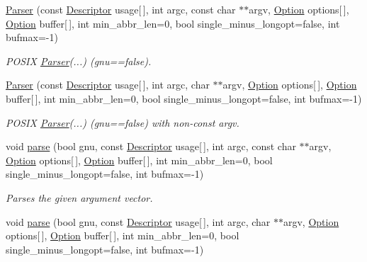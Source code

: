\begin{DoxyCompactItemize}
\hyperlink{classoption_1_1_parser_ae4100da4b662937ead22484e6cfc7cec}{Parser} (const \hyperlink{structoption_1_1_descriptor}{Descriptor} usage\mbox{[}$\,$\mbox{]}, int argc, const char $\ast$$\ast$argv, \hyperlink{classoption_1_1_option}{Option} options\mbox{[}$\,$\mbox{]}, \hyperlink{classoption_1_1_option}{Option} buffer\mbox{[}$\,$\mbox{]}, int min\+\_\+abbr\+\_\+len=0, bool single\+\_\+minus\+\_\+longopt=false, int bufmax=-\/1)
\begin{DoxyCompactList}\small\item\em P\+O\+S\+IX \hyperlink{classoption_1_1_parser}{Parser}(...) (gnu==false). \end{DoxyCompactList}\item 
\mbox{\label{classoption_1_1_parser_a23ee244634a38d05f6c4cb1e3692a8a9}} 
\hyperlink{classoption_1_1_parser_a23ee244634a38d05f6c4cb1e3692a8a9}{Parser} (const \hyperlink{structoption_1_1_descriptor}{Descriptor} usage\mbox{[}$\,$\mbox{]}, int argc, char $\ast$$\ast$argv, \hyperlink{classoption_1_1_option}{Option} options\mbox{[}$\,$\mbox{]}, \hyperlink{classoption_1_1_option}{Option} buffer\mbox{[}$\,$\mbox{]}, int min\+\_\+abbr\+\_\+len=0, bool single\+\_\+minus\+\_\+longopt=false, int bufmax=-\/1)
\begin{DoxyCompactList}\small\item\em P\+O\+S\+IX \hyperlink{classoption_1_1_parser}{Parser}(...) (gnu==false) with non-\/const argv. \end{DoxyCompactList}\item 
void \hyperlink{classoption_1_1_parser_a6e0b5778d1cfbd6cd51240e74d01e138}{parse} (bool gnu, const \hyperlink{structoption_1_1_descriptor}{Descriptor} usage\mbox{[}$\,$\mbox{]}, int argc, const char $\ast$$\ast$argv, \hyperlink{classoption_1_1_option}{Option} options\mbox{[}$\,$\mbox{]}, \hyperlink{classoption_1_1_option}{Option} buffer\mbox{[}$\,$\mbox{]}, int min\+\_\+abbr\+\_\+len=0, bool single\+\_\+minus\+\_\+longopt=false, int bufmax=-\/1)
\begin{DoxyCompactList}\small\item\em Parses the given argument vector. \end{DoxyCompactList}\item 
\mbox{\label{classoption_1_1_parser_ab26280e3b2ebc2f2fc4ed8b3b1e2a39c}} 
void \hyperlink{classoption_1_1_parser_ab26280e3b2ebc2f2fc4ed8b3b1e2a39c}{parse} (bool gnu, const \hyperlink{structoption_1_1_descriptor}{Descriptor} usage\mbox{[}$\,$\mbox{]}, int argc, char $\ast$$\ast$argv, \hyperlink{classoption_1_1_option}{Option} options\mbox{[}$\,$\mbox{]}, \hyperlink{classoption_1_1_option}{Option} buffer\mbox{[}$\,$\mbox{]}, int min\+\_\+abbr\+\_\+len=0, bool single\+\_\+minus\+\_\+longopt=false, int bufmax=-\/1)

\end{DoxyCompactItemize}
